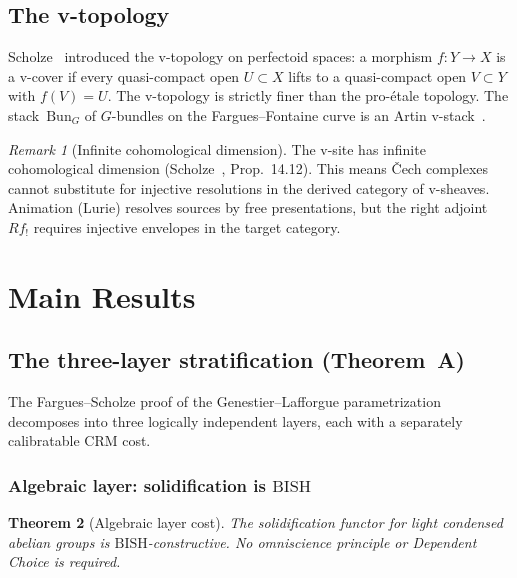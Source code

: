 \documentclass[12pt, a4paper]{article}
\theoremstyle{plain}
\newtheorem{theorem}{Theorem}[section]
\theoremstyle{definition}
\theoremstyle{remark}
\newtheorem{remark}[theorem]{Remark}
\newcommand{\BISH}{\mathrm{BISH}}
\begin{document}
\subsection{The v-topology}

Scholze~\cite{scholze-diamonds} introduced the v-topology on
perfectoid spaces: a morphism $f \colon Y \to X$ is a v-cover if
every quasi-compact open $U \subset X$ lifts to a quasi-compact
open $V \subset Y$ with $f(V) = U$.  The v-topology is strictly
finer than the pro-\'etale topology.  The stack~$\mathrm{Bun}_G$
of $G$-bundles on the Fargues--Fontaine curve is an Artin
v-stack~\cite{fargues-scholze}.

\begin{remark}[Infinite cohomological dimension]\label{rem:v-site}
The v-site has infinite cohomological dimension
(Scholze~\cite{scholze-diamonds}, Prop.~14.12).  This means
\v{C}ech complexes cannot substitute for injective resolutions
in the derived category of v-sheaves.  Animation (Lurie)
resolves sources by free presentations, but the right adjoint
$Rf_!$ requires injective envelopes in the target category.
\end{remark}


\section{Main Results}\label{sec:main}

\subsection{The three-layer stratification (Theorem~A)}

The Fargues--Scholze proof of the Genestier--Lafforgue
parametrization decomposes into three logically independent layers,
each with a separately calibratable CRM cost.

\subsubsection{Algebraic layer: solidification is $\BISH$}

\begin{theorem}[Algebraic layer cost]\label{thm:algebraic}
The solidification functor for light condensed abelian groups
is $\BISH$-constructive.  No omniscience principle or Dependent
Choice is required.
\end{theorem}
\end{document}
